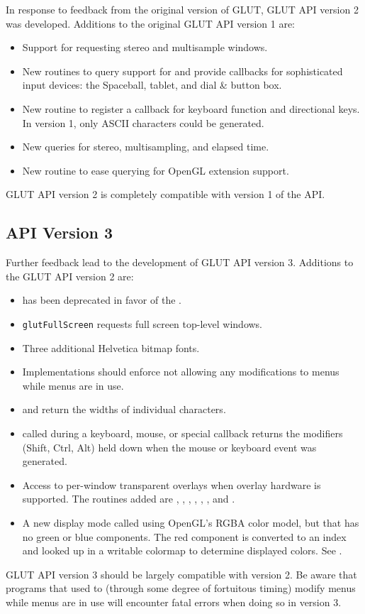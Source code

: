 \documentclass[titlepage,twoside]{article}
\begin{document}
In response to feedback from the original version of GLUT, GLUT API version
2 was developed.  Additions to the original GLUT API version 1 are:
\begin{itemize}
\item Support for requesting stereo and multisample windows.
\item New routines to query support for and provide callbacks for sophisticated
      input devices: the Spaceball, tablet, and dial \& button box.
\item New routine to register a callback for keyboard function and directional
      keys.  In version 1, only ASCII characters could be generated.
\item New queries for stereo, multisampling, and elapsed time.
\item New routine to ease querying for OpenGL extension support.
\end{itemize}
GLUT API version 2 is completely compatible with version 1 of the API.

\subsection{API Version 3}

Further feedback lead to the development of GLUT API version 3.
Additions to the GLUT API version 2 are:
\begin{itemize}
\item {} has been deprecated in favor of the
      .
\item {\tt glutFullScreen} requests full screen top-level windows.
\item Three additional Helvetica bitmap fonts.
\item Implementations should enforce not allowing any modifications
      to menus while menus are in use.
\item {} and  return the
      widths of individual characters.
\item {} called during a keyboard, mouse, or special
      callback returns the modifiers (Shift, Ctrl, Alt)
      held down when the mouse or keyboard event was generated.
\item Access to per-window transparent overlays when overlay hardware
      is supported.  The routines added are ,
      , ,
      , , ,
      and .
\item A new display mode called  using OpenGL's
      RGBA color model, but that has no green or blue components.  The red
      component is converted to an index and looked up in a writable
      colormap to determine displayed colors.  See .

\end{itemize}
GLUT API version 3 should be largely compatible with version 2.  Be
aware that programs that used to (through some degree of fortuitous
timing) modify menus while menus are in use will encounter fatal errors
when doing so in version 3.
\end{document}
